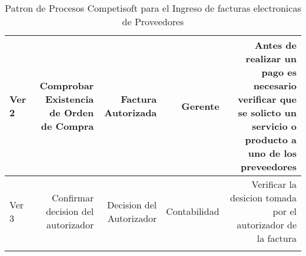 \begin{longtable}{|llrrrrrr|}
	\multicolumn{2}{|m{3cm}|}{Ver 2} & \multicolumn{1}{m{2cm}|}{Comprobar Existencia de Orden de Compra} & \multicolumn{1}{m{2.2cm}|}{Factura Autorizada} & \multicolumn{1}{m{2cm}|}{Gerente} & \multicolumn{3}{m{4cm}|}{Antes de realizar un pago es necesario verificar que se solicto un servicio o producto a uno de los preveedores} \\ \hline
	\multicolumn{2}{|m{3cm}|}{ Ver 3} & \multicolumn{1}{m{2cm}|}{Confirmar decision del autorizador} & \multicolumn{1}{m{2.2cm}|}{Decision del Autorizador} & \multicolumn{1}{m{1.5cm}|}{Contabilidad} & \multicolumn{3}{m{4cm}|}{Verificar la desicion tomada por el autorizador de la factura} \\ \hline		
    \caption{Patron de Procesos Competisoft para el Ingreso de facturas electronicas de Proveedores}
\end{longtable}